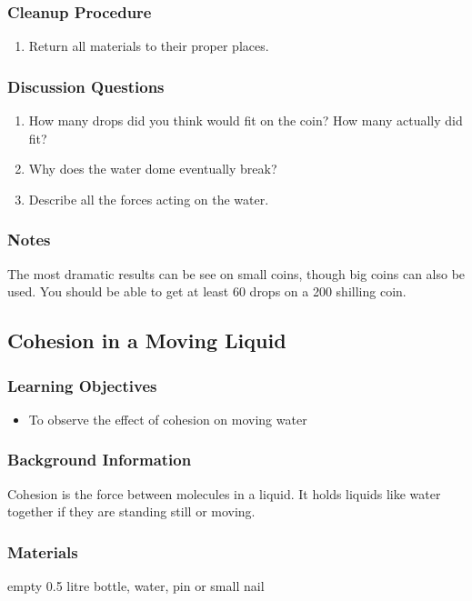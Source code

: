 \subsubsection*{Cleanup Procedure}
\begin{enumerate}
\item{Return all materials to their proper places.}
\end{enumerate}

\subsubsection*{Discussion Questions}
\begin{enumerate}
\item{How many drops did you think would fit on the coin?  How many actually did fit?}
\item{Why does the water dome eventually break?}
\item{Describe all the forces acting on the water.}
\end{enumerate}

\subsubsection*{Notes}
The most dramatic results can be see on small coins, though big coins can also be used.  You should be able to get at least 60 drops on a 200 shilling coin.

\subsection{Cohesion in a Moving Liquid}

\subsubsection*{Learning Objectives}
\begin{itemize}
\item{To observe the effect of cohesion on moving water}
\end{itemize}

\subsubsection*{Background Information}
Cohesion is the force between molecules in a liquid.  It holds liquids like water together if they are standing still or moving.

\subsubsection*{Materials}
empty 0.5 litre bottle, water, pin or small nail

